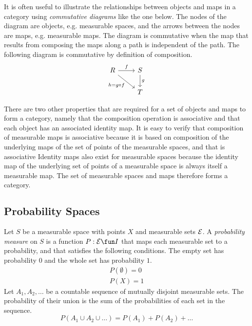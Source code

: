 \documentclass{article}
\begin{document}
It is often useful to illustrate the relationships between objects and maps in a category using {\it commutative diagrams}
like the one below.
The nodes of the diagram are objects, e.g. measurable spaces, and the arrows between the nodes are maps, e.g. measurable maps.
The diagram is commutative when the map that results from composing the maps along a path is independent of the path.
The following diagram is commutative by definition of composition.
\begin{equation}
\begin{tikzcd}
R \arrow{r}{f} \arrow{rd}[swap]{h = g \circ f}
				&S \arrow{d}{g} \\
				&T
\end{tikzcd}
\end{equation} 

There are two other properties that are required for a set of objects and maps to form a category, namely that the composition operation
is associative and that each object has an associated identity map.
It is easy to verify that composition of measurable maps is associative because it is based on composition of the underlying
maps of the set of points of the measurable spaces, and that is associative
Identity maps also exist for measurable spaces because the identity map of the underlying set of points of a measurable space is always itself a measurable map. The set of measurable spaces and maps therefore forms a category.

\subsection{Probability Spaces}

Let $S$ be a measurable space with points $X$ and measurable sets ${\cal E}$.
A {\it probability measure} on $S$ is a function $P : \calE \fun I$ that maps each measurable set to a probability, and that satisfies the following conditions.
The empty set has probability $0$ and the whole set has probability $1$.
\begin{eqnarray}
	P(\emptyset) = 0 \\
	P(X) = 1
\end{eqnarray}
Let $A_1, A_2, \ldots$ be a countable sequence of mutually disjoint measurable sets. 
The probability of their union is the sum of the probabilities of each set in the sequence.
\begin{equation}
	P(A_1 \cup A_2 \cup \ldots) = P(A_1) + P(A_2) + \ldots
\end{equation}
\end{document}
